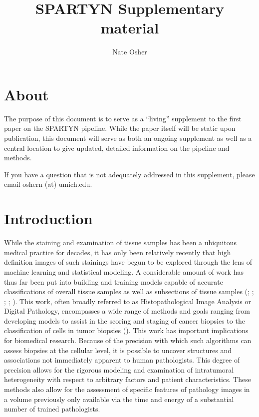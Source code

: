 \documentclass[
]{book}
\title{SPARTYN Supplementary material}
\author{Nate Osher}
\date{}
\begin{document}
\maketitle

{
\setcounter{tocdepth}{1}
\tableofcontents
}
\newcommand{\vb}[1]{\textcolor{blue}{\textsf{#1}}}
\newcommand{\no}[1]{\textcolor{red}{\textsf{[#1]}}}
\newcommand{\bm}[1]{{\mathbf{#1}}}

\hypertarget{about}{%
\chapter{About}\label{about}}

The purpose of this document is to serve as a ``living'' supplement to the
first paper on the SPARTYN pipeline. While the paper itself will be
static upon publication, this document will serve as both an ongoing
supplement as well as a central location to give updated, detailed
information on the pipeline and methods.

If you have a question that is not adequately addressed in this
supplement, please email oshern (at) umich.edu.

\hypertarget{introduction}{%
\chapter{Introduction}\label{introduction}}

While the staining and examination of tissue samples has been a
ubiquitous medical practice for decades, it
has only been relatively recently that high definition images of
such stainings have begun to be explored through the lens of
machine learning and statistical modeling. A considerable amount
of work has thus far been put into building and training models
capable of accurate classifications of overall tissue
samples as well as subsections of tissue samples (\citet{Saltz18}; \citet{Amgad19}; \citet{Lu20};
\citet{Negahbani21}; \citet{Bian21}). This work, often broadly
referred to as Histopathological Image Analysis or Digital
Pathology, encompasses a wide range of methods and goals ranging
from developing models to assist in the scoring and staging of
cancer biopsies to the classification of cells in tumor biopsies (\citet{Komura18}). This work has important implications for
biomedical research. Because of the precision with
which such algorithms can assess biopsies at the cellular level,
it is possible to uncover structures and associations not immediately apparent to human pathologists. This degree of precision allows for
the rigorous modeling and examination of intratumoral heterogeneity
with respect to arbitrary factors and patient characteristics.
These methods also allow for the assessment of specific features
of pathology images in a volume previously only available via the
time and energy of a substantial number of trained pathologists.
\end{document}

